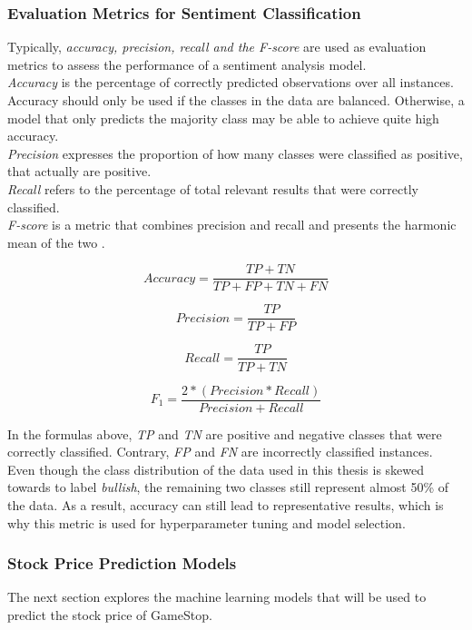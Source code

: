 \documentclass[11pt, a4paper]{article}
\begin{document}
\subsubsection{Evaluation Metrics for Sentiment Classification}
Typically, \emph{accuracy, precision, recall and the F-score} are used as evaluation metrics to assess the performance of a sentiment analysis model. \\
\emph{Accuracy} is the percentage of correctly predicted observations over all instances. Accuracy should only be used if the classes in the data are balanced.
Otherwise, a model that only predicts the majority class may be able to achieve quite high accuracy.\\
\emph{Precision} expresses the proportion of how many classes were classified as positive, that actually are positive.\\
\emph{Recall} refers to the percentage of total relevant results that were correctly classified.\\
\emph{F-score} is a metric that combines precision and recall and presents the harmonic mean of the two \citep{hossin2015evaluationmetrics}.

\begin{equation*}
    Accuracy = \frac{TP+TN}{TP+FP+TN+FN}
\end{equation*}

\begin{equation*}
    Precision = \frac{TP}{TP+FP}
\end{equation*}

\begin{equation*}
    Recall = \frac{TP}{TP+TN}
\end{equation*}

\begin{equation*}
    F_{1}=\frac{2*(Precision * Recall)}{Precision + Recall}
\end{equation*}

\noindent In the formulas above, \emph{TP} and \emph{TN} are positive and negative classes that were correctly classified. Contrary, \emph{FP} and \emph{FN} are
incorrectly classified instances.\\
Even though the class distribution of the data used in this thesis is skewed towards to label \emph{bullish}, the remaining two classes still represent
almost 50\% of the data. As a result, accuracy can still lead to representative results, which is why this metric is used for hyperparameter tuning and model selection.

\subsubsection{Stock Price Prediction Models}
The next section explores the machine learning models that will be used to predict the stock price of GameStop. \\
\end{document}
